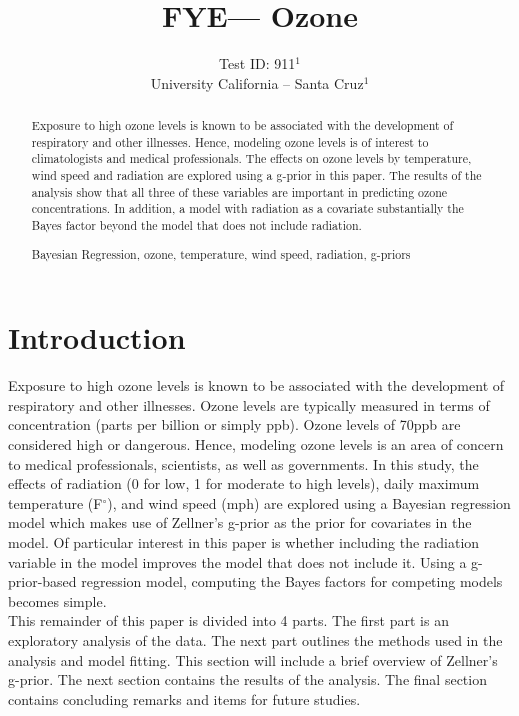 \documentclass{../../tex_template/asaproc}
\title{FYE--- Ozone}
\author{
  Test ID: 911$^1$\\
  University California -- Santa Cruz$^1$\\
}
\begin{document}
\maketitle
\begin{abstract}
Exposure to high ozone levels is known to be associated with the development
of respiratory and other illnesses. Hence, modeling ozone levels is of interest
to climatologists and medical professionals. The effects on ozone levels by
temperature, wind speed and radiation are explored using a g-prior in this 
paper. The results of the analysis show that all three of these variables are
important in predicting ozone concentrations. In addition, a model with
radiation as a covariate substantially the Bayes factor beyond the model
that does not include radiation.

\begin{keywords}
Bayesian Regression, ozone, temperature, wind speed, radiation, g-priors
\end{keywords}
\end{abstract}

\section{Introduction}
Exposure to high ozone levels is known to be associated with the development of
respiratory and other illnesses. Ozone levels are typically measured in terms
of concentration (parts per billion or simply ppb). Ozone levels of 70ppb are
considered high or dangerous. Hence, modeling ozone levels is an area of
concern to medical professionals, scientists, as well as governments. In this
study, the effects of radiation (0 for low, 1 for moderate to high levels),
daily maximum temperature (F$^\circ$), and wind speed (mph) are explored using
a Bayesian regression model which makes use of Zellner's g-prior as the prior
for covariates in the model. Of particular interest in this paper is whether
including the radiation variable in the model improves the model that does not
include it.  Using a g-prior-based regression model, computing the Bayes
factors for competing models becomes simple.\\

This remainder of this paper is divided into 4 parts. The first part is an 
exploratory analysis of the data. The next part outlines the methods used in
the analysis and model fitting. This section will include a brief overview
of Zellner's g-prior. The next section contains the results of the analysis.
The final section contains concluding remarks and items for future studies.
\end{document}
